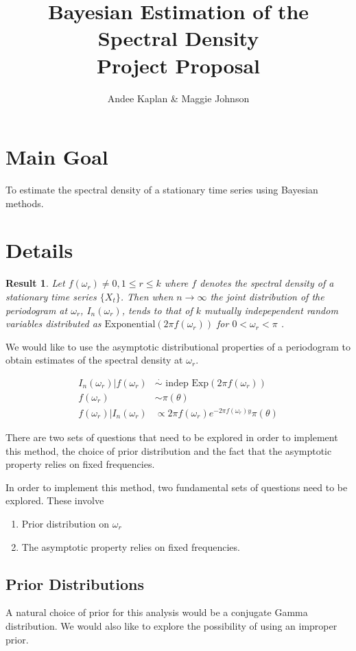 \documentclass{article}\usepackage[]{graphicx}\usepackage[]{color}
\title{Bayesian Estimation of the Spectral Density \\ {\small Project Proposal}}
\author{Andee Kaplan \& Maggie Johnson}
\newcommand{\mj}[1]{{\color{blue} #1}}
\theoremstyle{plain}
\newtheorem*{res}{Result}
\begin{document}
\maketitle

\section*{Main Goal}
To estimate the spectral density of a stationary time series using Bayesian methods.

\section*{Details}
\begin{res}
Let $f(\omega_r) \not= 0, 1 \le r \le k$ where $f$ denotes the spectral density of a stationary time series $\{X_t\}$. Then when $n\rightarrow \infty$ the joint distribution of the periodogram at $\omega_r$, $I_n(\omega_r)$, tends to that of $k$ mutually indepependent random variables distributed as $\text{Exponential}(2\pi f(\omega_r))$ for $0<\omega_r<\pi$ \cite{JAZ:4921656}.
\end{res}

We would like to use the asymptotic distributional properties of a periodogram to obtain estimates of the spectral density at $\omega_r$.

\begin{align*}
I_n(\omega_r) |f(\omega_r) &\stackrel{\cdot}{\sim}\text{ indep } \text{Exp}(2\pi f(\omega_r)) \\
f(\omega_r) & \sim \pi(\theta)\\
f(\omega_r) | I_n(\omega_r) &\propto 2\pi f(\omega_r) e^{-2\pi f(\omega_r) y} \pi(\theta)
\end{align*}

There are two sets of questions that need to be explored in order to implement this method, the choice of prior distribution and the fact that the asymptotic property relies on fixed frequencies.
\mj{In order to implement this method, two fundamental sets of questions need to be explored. These involve
\begin{enumerate}
\item Prior distribution on $\omega_r$
\item The asymptotic property relies on fixed frequencies.
\end{enumerate}
}

\subsection*{Prior Distributions}
A natural choice of prior for this analysis would be a \mj{conjugate Gamma distribution}. We would also like to explore the possibility of using an improper prior.
\end{document}
